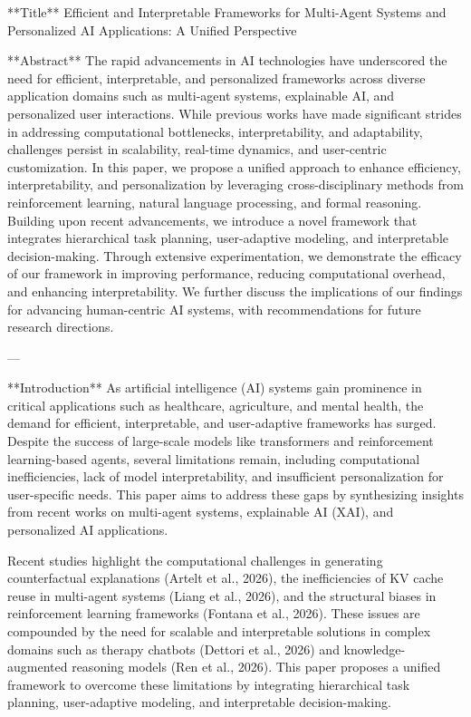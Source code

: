 **Title**  
Efficient and Interpretable Frameworks for Multi-Agent Systems and Personalized AI Applications: A Unified Perspective  

**Abstract**  
The rapid advancements in AI technologies have underscored the need for efficient, interpretable, and personalized frameworks across diverse application domains such as multi-agent systems, explainable AI, and personalized user interactions. While previous works have made significant strides in addressing computational bottlenecks, interpretability, and adaptability, challenges persist in scalability, real-time dynamics, and user-centric customization. In this paper, we propose a unified approach to enhance efficiency, interpretability, and personalization by leveraging cross-disciplinary methods from reinforcement learning, natural language processing, and formal reasoning. Building upon recent advancements, we introduce a novel framework that integrates hierarchical task planning, user-adaptive modeling, and interpretable decision-making. Through extensive experimentation, we demonstrate the efficacy of our framework in improving performance, reducing computational overhead, and enhancing interpretability. We further discuss the implications of our findings for advancing human-centric AI systems, with recommendations for future research directions.

---

**Introduction**  
As artificial intelligence (AI) systems gain prominence in critical applications such as healthcare, agriculture, and mental health, the demand for efficient, interpretable, and user-adaptive frameworks has surged. Despite the success of large-scale models like transformers and reinforcement learning-based agents, several limitations remain, including computational inefficiencies, lack of model interpretability, and insufficient personalization for user-specific needs. This paper aims to address these gaps by synthesizing insights from recent works on multi-agent systems, explainable AI (XAI), and personalized AI applications.

Recent studies highlight the computational challenges in generating counterfactual explanations (Artelt et al., 2026), the inefficiencies of KV cache reuse in multi-agent systems (Liang et al., 2026), and the structural biases in reinforcement learning frameworks (Fontana et al., 2026). These issues are compounded by the need for scalable and interpretable solutions in complex domains such as therapy chatbots (Dettori et al., 2026) and knowledge-augmented reasoning models (Ren et al., 2026). This paper proposes a unified framework to overcome these limitations by integrating hierarchical task planning, user-adaptive modeling, and interpretable decision-making.

